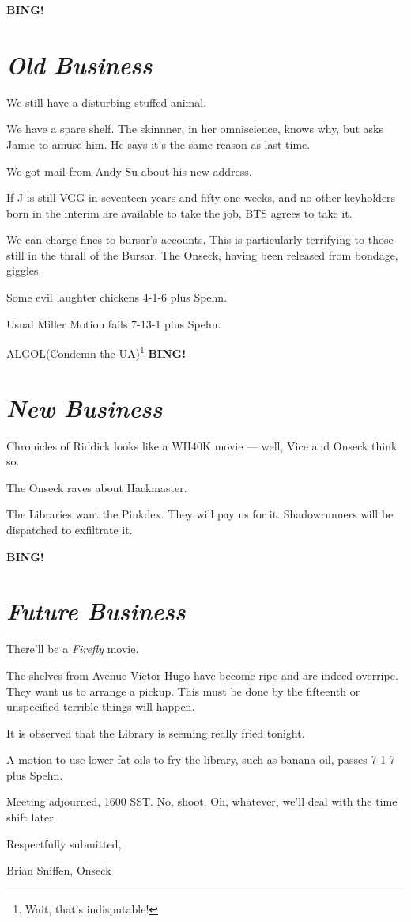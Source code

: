 \documentclass[10pt]{article}
\newcommand{\bing}{{\bf BING!} }
\newcommand{\goto}[1]{\bing \vskip 12pt \section*{{\em{#1}}}}
\newcommand{\ps}{ plus Spehn\xspace}
\begin{document}
\goto{Old Business}

We still have a disturbing stuffed animal.

We have a spare shelf.  The skinnner, in her omniscience, knows why,
but asks Jamie to amuse him.  He says it's the same reason as last
time.

We got mail from Andy Su about his new address.

If J is still VGG in seventeen years and fifty-one weeks, and no other
keyholders born in the interim are available to take the job, BTS
agrees to take it.

We can charge fines to bursar's accounts.  This is particularly
terrifying to those still in the thrall of the Bursar.  The Onseck,
having been released from bondage, giggles.

Some evil laughter chickens 4-1-6\ps.

Usual Miller Motion fails 7-13-1\ps.

ALGOL(Condemn the UA)\footnote{Wait, that's indisputable!}
\goto{New Business}
Chronicles of Riddick looks like a WH40K movie --- well, Vice and
Onseck think so.

The Onseck raves about Hackmaster.

The Libraries want the Pinkdex.  They will pay us for it.
Shadowrunners will be dispatched to exfiltrate it.

\goto{Future Business}

There'll be a \emph{Firefly} movie.

The shelves from Avenue Victor Hugo have become ripe and are indeed
overripe.  They want us to arrange a pickup.  This must be done by the
fifteenth or unspecified terrible things will happen.

It is observed that the Library is seeming really fried tonight.

A motion to use lower-fat oils to fry the library, such as banana oil,
passes 7-1-7\ps.


\vspace{12pt}

\noindent
Meeting adjourned, 1600 SST.  No, shoot.  Oh, whatever, we'll deal
with the time shift later.

\vspace{18pt}

\centerline{Respectfully submitted,}
\centerline{Brian Sniffen, Onseck}
\end{document}
